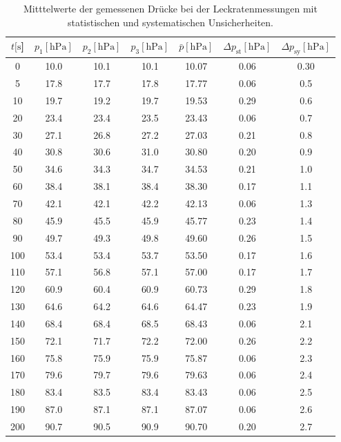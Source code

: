 \begin{table}[H]
  \centering
    \caption{Mitttelwerte der gemessenen Drücke bei der Leckratenmessungen mit statistischen und systematischen Unsicherheiten.}
    \label{tab:Dreh_Leck2}
    \begin{tabular}{
      S[table-format=3.0] 
      S[table-format=2.1] S[table-format=2.1] S[table-format=2.1]
      S[table-format=2.2] S[table-format=1.2] S[table-format=1.2]
      }
      \toprule
      {$t [\si{\second}$]} &
      {$p_1 [\si{\hecto\pascal}]$} & {$p_2 [\si{\hecto\pascal}]$} & {$p_3 [\si{\hecto\pascal}]$} &
      {$\bar{p} [\si{\hecto\pascal}]$} & {$\Delta p_\text{st} [\si{\hecto\pascal}]$} & {$\Delta p_\text{sy} [\si{\hecto\pascal}]$}\\
          & 10.0 & 10.1 & 10.1 & 10.07 & 0.06 & 0.30\\
      5    & 17.8 & 17.7 & 17.8 & 17.77 & 0.06 & 0.5 \\
      10   & 19.7 & 19.2 & 19.7 & 19.53 & 0.29 & 0.6 \\
      20   & 23.4 & 23.4 & 23.5 & 23.43 & 0.06 & 0.7 \\
      30   & 27.1 & 26.8 & 27.2 & 27.03 & 0.21 & 0.8 \\
      40   & 30.8 & 30.6 & 31.0 & 30.80 & 0.20 & 0.9 \\
      50   & 34.6 & 34.3 & 34.7 & 34.53 & 0.21 & 1.0 \\
      60   & 38.4 & 38.1 & 38.4 & 38.30 & 0.17 & 1.1 \\
      70   & 42.1 & 42.1 & 42.2 & 42.13 & 0.06 & 1.3 \\
      80   & 45.9 & 45.5 & 45.9 & 45.77 & 0.23 & 1.4 \\
      90   & 49.7 & 49.3 & 49.8 & 49.60 & 0.26 & 1.5 \\
      100  & 53.4 & 53.4 & 53.7 & 53.50 & 0.17 & 1.6 \\
      110  & 57.1 & 56.8 & 57.1 & 57.00 & 0.17 & 1.7 \\
      120  & 60.9 & 60.4 & 60.9 & 60.73 & 0.29 & 1.8 \\
      130  & 64.6 & 64.2 & 64.6 & 64.47 & 0.23 & 1.9 \\
      140  & 68.4 & 68.4 & 68.5 & 68.43 & 0.06 & 2.1 \\
      150  & 72.1 & 71.7 & 72.2 & 72.00 & 0.26 & 2.2 \\
      160  & 75.8 & 75.9 & 75.9 & 75.87 & 0.06 & 2.3 \\
      170  & 79.6 & 79.7 & 79.6 & 79.63 & 0.06 & 2.4 \\
      180  & 83.4 & 83.5 & 83.4 & 83.43 & 0.06 & 2.5 \\
      190  & 87.0 & 87.1 & 87.1 & 87.07 & 0.06 & 2.6 \\
      200  & 90.7 & 90.5 & 90.9 & 90.70 & 0.20 & 2.7 \\
      \bottomrule
    \end{tabular}
\end{table}
